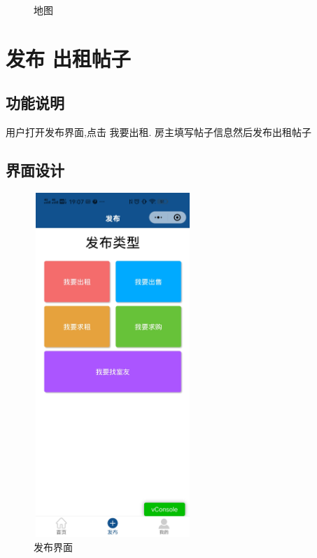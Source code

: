 \begin{figure}[htbp]
\begin{minipage}[t]{0.48\textwidth}
    \caption{地图}
    \end{minipage}
    \end{figure}

\newpage
\section{发布 出租帖子}

\subsection{功能说明}
用户打开发布界面,点击 我要出租.
房主填写帖子信息然后发布出租帖子
\subsection{界面设计}
\begin{figure}[htbp]
    \centering
    \begin{minipage}[t]{0.48\textwidth}
    \centering
    \includegraphics[width=6cm,height=13cm]{design/image/fabu0.png} 
    \caption{发布界面}
    \end{minipage}
    \begin{minipage}[t]{0.48\textwidth}
    \centering

\end{minipage}
\end{figure}
